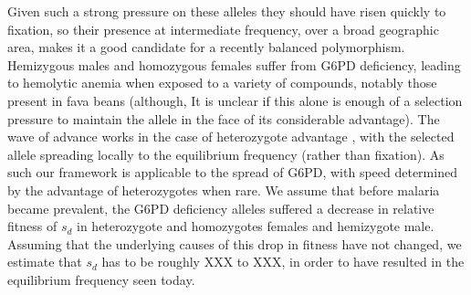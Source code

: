 \documentclass{article}
\begin{document}
Given such a strong pressure on these alleles they should have risen
quickly to fixation, so their presence at intermediate frequency,
over a broad geographic area, makes it a good candidate for a recently
balanced polymorphism. 
Hemizygous males and homozygous females suffer from G6PD deficiency,
leading to hemolytic anemia when exposed to a variety of compounds, notably
those present in fava beans (although, It is unclear if this alone is enough of a
selection pressure to maintain the allele in the face of its
considerable advantage). 
The wave of advance works in the case of heterozygote advantage
\citep{aronson1975nonlinear}, with the selected allele spreading
locally to the equilibrium frequency (rather than fixation). As such
our framework is applicable to the spread of G6PD, with speed determined by the advantage of heterozygotes when rare.
We assume that before malaria became prevalent, the G6PD deficiency alleles suffered a
decrease in relative fitness of $s_d$ in heterozygote and homozygotes females and
hemizygote male. Assuming that the underlying causes of this drop in fitness have
not changed, we estimate that $s_d$ has to be roughly
XXX to XXX, in order to have resulted in the equilibrium frequency
seen today. 







\end{document}
